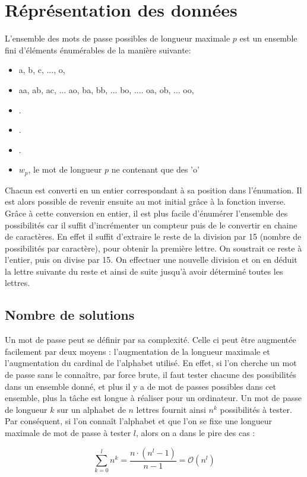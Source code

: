 \documentclass[a4paper,11pt]{article}
\begin{document}
\section{Réprésentation des données}
L'ensemble des mots de passe possibles de longueur maximale $p$ est un ensemble fini d'éléments énumérables  de la manière suivante:
\begin{itemize}
\item a, b, c, ..., o,
\item aa, ab, ac, ... ao, ba, bb, ... bo, .... oa, ob, ... oo,
\item .
\item .
\item .
\item $w_{p}$, le mot de longueur $p$ ne contenant que des 'o'
\end{itemize}
Chacun est converti en un entier correspondant à sa position dans l'énumation. Il est alors possible de revenir ensuite au mot initial grâce à la fonction inverse. Grâce à cette conversion en entier, il est plus facile d'énumérer l'ensemble des possibilités car il suffit d'incrémenter un compteur puis de le convertir en chaine de caractères. En effet il suffit d'extraire le reste de la division par 15 (nombre de possibilités par caractère), pour obtenir la première lettre. On soustrait ce reste à l'entier, puis on divise par 15. On effectuer une nouvelle division et on en déduit la lettre suivante du reste et ainsi de suite jusqu'à avoir déterminé toutes les lettres.


\subsection{Nombre de solutions}

Un mot de passe peut se définir par sa complexité. Celle ci peut être augmentée facilement par deux moyens : l'augmentation de la longueur maximale et l'augmentation du cardinal de l'alphabet utilisé. En effet, si l'on cherche un mot de passe sans le connaître, par force brute, il faut tester chacune des possibilités dans un ensemble donné, et plus il y a de mot de passes possibles dans cet ensemble, plus la tâche est longue à réaliser pour un ordinateur. Un mot de passe de longueur $k$ sur un alphabet de $n$ lettres fournit ainsi $n^k$ possibilités à tester. Par conséquent, si l'on connaît l'alphabet et que l'on se fixe une longueur maximale de mot de passe à tester $l$, alors on a dans le pire des cas :

\[
\sum_{k=0}^{l}n^k = \frac{n \cdot (n^l - 1)}{n - 1} = \mathcal{O}(n^l)
\]
\end{document}

